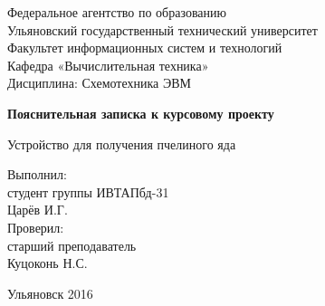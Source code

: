 

\begin{center}
	\renewcommand{\baselinestretch}{1}
	\small
		Федеральное агентство по образованию \\
		Ульяновский государственный технический университет \\
		Факультет информационных систем и технологий \\
		Кафедра «Вычислительная техника» \\
	
	\normalsize
	\vspace{30ex}
	\renewcommand{\baselinestretch}{1.5}
		Дисциплина: Схемотехника ЭВМ
		
	\renewcommand{\baselinestretch}{1.5}
	\large 
		\textbf{Пояснительная записка к курсовому проекту}
		
		Устройство для получения пчелиного яда
\end{center}

\vspace{20ex}
\begin{flushright}
	Выполнил: \\
	студент группы ИВТАПбд-31 \\
	Царёв И.Г. \\
	Проверил: \\ 
	старший преподаватель \\
	Куцоконь Н.С.
\end{flushright}

\vfill
\begin{center}
	Ульяновск 2016
\end{center}